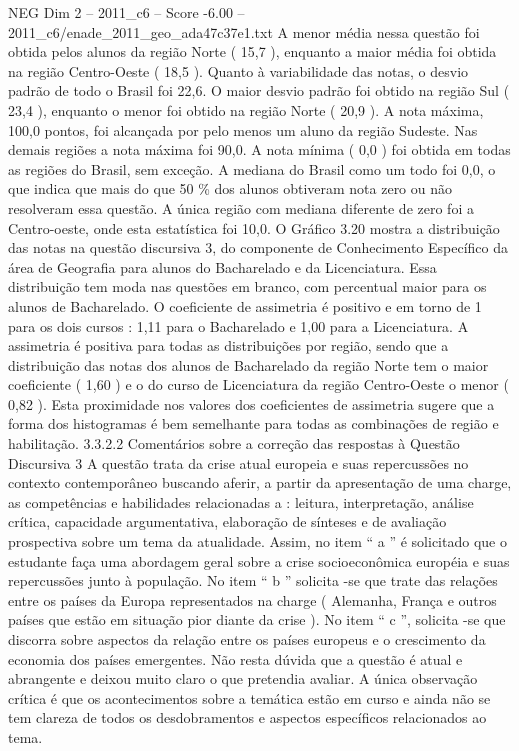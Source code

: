 \begin{textsample}{NEG Dim 2 – 2011\_c6 – Score -6.00 – 2011\_c6/enade\_2011\_geo\_ada47c37e1.txt}
A menor média nessa questão foi obtida pelos alunos da região Norte ( 15,7 ), enquanto a maior média foi obtida na região Centro-Oeste ( 18,5 ).
Quanto à variabilidade das notas, o desvio padrão de todo o Brasil foi 22,6.
O maior desvio padrão foi obtido na região Sul ( 23,4 ), enquanto o menor foi obtido na região Norte ( 20,9 ).
A nota máxima, 100,0 pontos, foi alcançada por pelo menos um aluno da região Sudeste.
Nas demais regiões a nota máxima foi 90,0.
A nota mínima ( 0,0 ) foi obtida em todas as regiões do Brasil, sem exceção.
A mediana do Brasil como um todo foi 0,0, o que indica que mais do que 50 \% dos alunos obtiveram nota zero ou não resolveram essa questão.
A única região com mediana diferente de zero foi a Centro-oeste, onde esta estatística foi 10,0.
O Gráfico 3.20 mostra a distribuição das notas na questão discursiva 3, do componente de Conhecimento Específico da área de Geografia para alunos do Bacharelado e da Licenciatura.
Essa distribuição tem moda nas questões em branco, com percentual maior para os alunos de Bacharelado.
O coeficiente de assimetria é positivo e em torno de 1 para os dois cursos : 1,11 para o Bacharelado e 1,00 para a Licenciatura.
A assimetria é positiva para todas as distribuições por região, sendo que a distribuição das notas dos alunos de Bacharelado da região Norte tem o maior coeficiente ( 1,60 ) e o do curso de Licenciatura da região Centro-Oeste o menor ( 0,82 ).
Esta proximidade nos valores dos coeficientes de assimetria sugere que a forma dos histogramas é bem semelhante para todas as combinações de região e habilitação. 3.3.2.2 Comentários sobre a correção das respostas à Questão Discursiva 3 A questão trata da crise atual europeia e suas repercussões no contexto contemporâneo buscando aferir, a partir da apresentação de uma charge, as competências e habilidades relacionadas a : leitura, interpretação, análise crítica, capacidade argumentativa, elaboração de sínteses e de avaliação prospectiva sobre um tema da atualidade.
Assim, no item “ a ” é solicitado que o estudante faça uma abordagem geral sobre a crise socioeconômica européia e suas repercussões junto à população.
No item “ b ” solicita -se que trate das relações entre os países da Europa representados na charge ( Alemanha, França e outros países que estão em situação pior diante da crise ).
No item “ c ”, solicita -se que discorra sobre aspectos da relação entre os países europeus e o crescimento da economia dos países emergentes.
Não resta dúvida que a questão é atual e abrangente e deixou muito claro o que pretendia avaliar.
A única observação crítica é que os acontecimentos sobre a temática estão em curso e ainda não se tem clareza de todos os desdobramentos e aspectos específicos relacionados ao tema.

\end{textsample}
